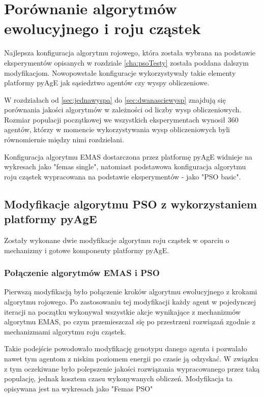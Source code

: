 \chapter{Porównanie algorytmów ewolucyjnego i roju cząstek}
\label{cha:psovsemas}

Najlepsza konfiguracja algorytmu rojowego, która została wybrana na podstawie eksperymentów opisanych w rozdziale \ref{cha:psoTesty} została poddana dalszym modyfikacjom. Nowopowstałe konfiguracje wykorzystywały takie elementy platformy pyAgE jak sąsiedztwo agentów czy wyspy obliczeniowe.

W rozdziałach od \ref{sec:jednawyspa} do \ref{sec:dwanasciewysp} znajdują się porównania jakości algorytmów w zależności od liczby wysp obliczeniowych. Rozmiar populacji początkowej we wszystkich eksperymentach wynosił 360 agentów, którzy w momencie wykorzystywania wysp obliczeniowych byli równomiernie między nimi rozdzielani.

Konfiguracja algorytmu EMAS dostarczona przez platformę pyAgE widnieje na wykresach jako "femas single", natomiast podstawowa konfiguracja algorytmu roju cząstek wypracowana na podstawie eksperymentów - jako "PSO basic".


\section{Modyfikacje algorytmu PSO z wykorzystaniem platformy pyAgE}

Zostały wykonane dwie modyfikacje algorytmu roju cząstek w oparciu o mechanizmy i gotowe komponenty platformy pyAgE.


\subsection*{Połączenie algorytmów EMAS i PSO}

Pierwszą modyfikacją było połączenie kroków algorytmu ewolucyjnego z krokami algorytmu rojowego. Po zastosowaniu tej modyfikacji każdy agent w pojedynczej iteracji na początku wykonywał wszystkie akcje wynikające z mechanizmów algorytmu EMAS, po czym przemieszczał się po przestrzeni rozwiązań zgodnie z mechanizmami algorytmu roju cząstek.

Takie podejście powodowało modyfikację genotypu danego agenta i pozwalało nawet tym agentom z niskim poziomem energii po czasie ją odzyskać. W związku z tym oczekiwane było polepszenie jakości rozwiązania wypracowanego przez taką populację, jednak kosztem czasu wykonywanych obliczeń. Modyfikacja ta opisywana jest na wykresach jako "Femas PSO"


